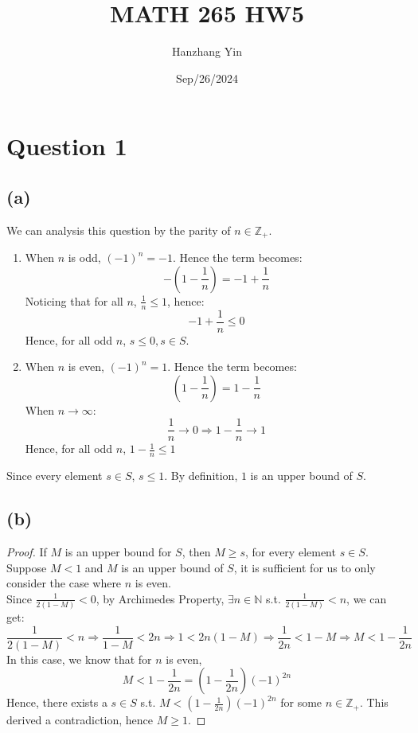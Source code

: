 \documentclass{article}
\title{MATH 265 HW5}
\author{Hanzhang Yin}
\date{Sep/26/2024}
\begin{document}
\maketitle

\section*{Question 1}

\subsection*{(a)}
We can analysis this question by the parity of $n \in \mathbb{Z}_{+}$.
\begin{enumerate}
    \item When $n$ is odd, \((-1)^n = -1 \). Hence the term becomes:
    \\
    \[ - \left( 1 - \frac{1}{n} \right) = -1 + \frac{1}{n} \]
    Noticing that for all $n$, $\frac{1}{n} \leq 1$, hence: 
    \[ -1 + \frac{1}{n} \leq 0 \]
    Hence, for all odd $n$, \( s \leq 0, s \in S \).
    \item When $n$ is even, \((-1)^n = 1 \). Hence the term becomes:
    \[ \left( 1 - \frac{1}{n} \right) = 1 - \frac{1}{n} \]
    When $n \rightarrow \infty$:
    \[ \frac{1}{n} \rightarrow 0 \Rightarrow 1 - \frac{1}{n} \rightarrow 1 \]
    Hence, for all odd $n$, \( 1 - \frac{1}{n} \leq 1 \)
\end{enumerate}
Since every element $s \in S$, $s \leq 1$. By definition, $1$ is an upper bound of $S$.

\subsection*{(b)}

\begin{proof}
    If $M$ is an upper bound for $S$, then $M \geq s$, for every element $s \in S$.
    \\
    Suppose $M < 1$ and $M$ is an upper bound of $S$, it is sufficient for us to only consider the case where $n$ is even.
    \\
    Since \( \frac{1}{2(1-M)} < 0 \), by Archimedes Property, \( \exists n \in \mathbb{N} \) s.t. \( \frac{1}{2(1-M)} < n \), we can get:
    \[ \frac{1}{2(1-M)} < n \Rightarrow \frac{1}{1 - M} < 2n \Rightarrow 1 < 2n(1 - M) \Rightarrow \frac{1}{2n} < 1 - M \Rightarrow M < 1 - \frac{1}{2n} \]
    In this case, we know that for $n$ is even,
    \[ M < 1 - \frac{1}{2n} = (1 - \frac{1}{2n})(-1)^{2n} \]
    Hence, there exists a $s \in S$ s.t. $M < (1 - \frac{1}{2n})(-1)^{2n}$ for some $n \in \mathbb{Z}_{+}$.
    This derived a contradiction, hence $M \geq 1$.
\end{proof}
\end{document}
